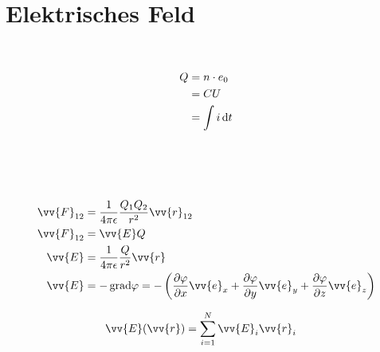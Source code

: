 \section{Elektrisches Feld}

\begin{boxleft}
\\
\end{boxleft}\begin{boxrightshaded}
\begin{align*}
Q	&=n\cdot e_0\\
	&=CU\\
	&=\int i \mathop{}\!\mathrm{d} t
\end{align*}
\end{boxrightshaded}

\begin{boxleft}
\\
\\
\\
\end{boxleft}\begin{boxrightshaded}
\begin{align*}
\vv{F}_{12}&=\frac{1}{4\pi\epsilon}\frac{Q_1Q_2}{r^2}\vv{r}_{12}\\
\vv{F}_{12}&=\vv{E}Q\\
\vv{E}&=\frac{1}{4\pi\epsilon}\frac{Q}{r^2}\vv{r}\\
\vv{E}&=-\grad\varphi=-\left(\frac{\partial \varphi}{\partial x}\vv{e}_x+\frac{\partial \varphi}{\partial y}\vv{e}_y+\frac{\partial \varphi}{\partial z}\vv{e}_z\right)
\end{align*}
\end{boxrightshaded}

\begin{boxleft}
\end{boxleft}\begin{boxrightshaded}
\begin{align*}
\vv{E}(\vv{r})&=\sum_{i=1}^{N}\vv{E}_i{\vv{r}_i}
\end{align*}
\end{boxrightshaded}

